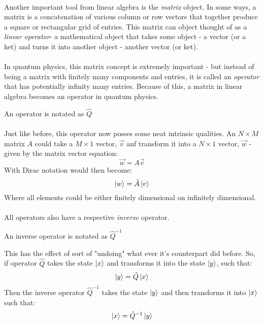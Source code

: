 \documentclass[12pt,letterpaper]{book}
\begin{document}
\paragraph*{}Another important tool from linear algebra is the \textit{matrix} object. In some ways, a matrix is a concatenation of various column or row vectors that together produce a square or rectangular grid of entries. This matrix can object thought of as a \textit{linear operator}- a mathematical object that takes some object - a vector (or a ket) and turns it into another object - another vector (or ket).

\paragraph*{}In quantum physics, this matrix concept is extremely important - but instead of being a matrix with finitely many components and entries, it is called an \textit{operator} that has potentially infinity many entries. Because of this, a matrix in linear algebra becomes an operator in quantum physics.
\begin{center}
An operator is notated as $\hat{Q}$
\end{center}

\paragraph*{}Just like before, this operator now posses some neat intrinsic qualities. An $N \times M$ matrix $A$ could take a $M \times 1$ vector, $\vec{v}$ anf transform it into a $N \times 1$ vector, $\vec{w}$ - given by the matrix vector equation:
\begin{equation}
\label{mat-vec}
\vec{w} =  A\vec{v}
\end{equation}
With Dirac notation would then become:
\begin{equation}
\label{op-ket}
\ket{w} = \hat{A}\ket{v}
\end{equation}
Where all elements could be either finitely dimensional on infinitely dimensional.

\paragraph*{}All operators also have a respective \textit{inverse} operator.
\begin{center}
An inverse operator is notated as $\hat{Q}^{-1}$
\end{center}
This has the effect of sort of "undoing" what ever it's counterpart did before. So, if operator $\hat{Q}$ takes the state $\ket{x}$ and transforms it into the state $\ket{y}$, such that:
\begin{equation}
\ket{y} = \hat{Q}\ket{x}
\end{equation}
Then the inverse operator $\hat{Q}^{-1}$ takes the state $\ket{y}$ and then transforms it into $\ket{x}$ such that:
\begin{equation}
\ket{x} = \hat{Q}^{-1}\ket{y}
\end{equation}
\end{document}

